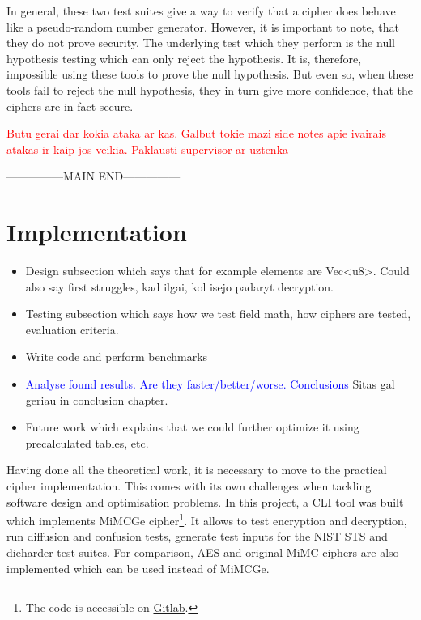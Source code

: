 \documentclass{Resources/UoBLab1}
\theoremstyle{definition}
\begin{document}
In general, these two test suites give a way to verify that a cipher does behave like a pseudo-random number generator. However, it is important to note, that they do not prove security. The underlying test which they perform is the null hypothesis testing which can only reject the hypothesis. It is, therefore, impossible using these tools to prove the null hypothesis. But even so, when these tools fail to reject the null hypothesis, they in turn give more confidence, that the ciphers are in fact secure.  

\textcolor{red}{Butu gerai dar kokia ataka ar kas. Galbut tokie mazi side notes apie ivairais atakas ir kaip jos veikia. Paklausti supervisor ar uztenka}

---------------MAIN END---------------

\section{Implementation}\label{chapter:implementation}
\begin{itemize}
    \item Design subsection which says that for example elements are Vec<u8>. Could also say first struggles, kad ilgai, kol isejo padaryt decryption.
    \item Testing subsection which says how we test field math, how ciphers are tested, evaluation criteria.
    \item Write code and perform benchmarks
    \item \textcolor{blue}{Analyse found results. Are they faster/better/worse. Conclusions} Sitas gal geriau in conclusion chapter.
    \item Future work which explains that we could further optimize it using precalculated tables, etc.
\end{itemize}

Having done all the theoretical work, it is necessary to move to the practical cipher implementation. This comes with its own challenges when tackling software design and optimisation problems. In this project, a CLI tool was built which implements MiMCGe cipher\footnote{\label{note:git}The code is accessible on \href{https://git.cs.bham.ac.uk/projects-2023-24/sxt063}{Gitlab}.}. It allows to test encryption and decryption, run diffusion and confusion tests, generate test inputs for the NIST STS and dieharder test suites. For comparison, AES and original MiMC ciphers are also implemented which can be used instead of MiMCGe.
\end{document}
